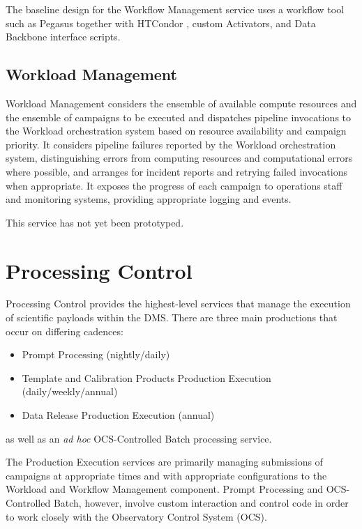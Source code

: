 \documentclass[DM,toc]{lsstdoc}
\begin{document}
The baseline design for the Workflow Management service uses a workflow tool
such as Pegasus \citep{Pegasus} together with HTCondor \citep{HTCondor}, custom
Activators, and Data Backbone interface scripts.

\subsection{Workload Management}\label{workload-management}

Workload Management considers the ensemble of available compute resources and
the ensemble of campaigns to be executed and dispatches pipeline invocations to
the Workload orchestration system based on resource availability and campaign
priority.  It considers pipeline failures reported by the Workload
orchestration system, distinguishing errors from computing resources and
computational errors where possible, and arranges for incident reports and
retrying failed invocations when appropriate.  It exposes the progress of each
campaign to operations staff and monitoring systems, providing appropriate
logging and events.

This service has not yet been prototyped.


\section{Processing Control}\label{processing-control}

Processing Control provides the highest-level services that manage the
execution of scientific payloads within the DMS.  There are three main
productions that occur on differing cadences:
\begin{itemize}
	\item Prompt Processing (nightly/daily)
	\item Template and Calibration Products Production Execution (daily/weekly/annual)
	\item Data Release Production Execution (annual)
\end{itemize}
as well as an \textit{ad hoc} OCS-Controlled Batch processing service.

The Production Execution services are primarily managing submissions of
campaigns at appropriate times and with appropriate configurations to the
Workload and Workflow Management component.  Prompt Processing and
OCS-Controlled Batch, however, involve custom interaction and control code in
order to work closely with the Observatory Control System (OCS).
\end{document}
